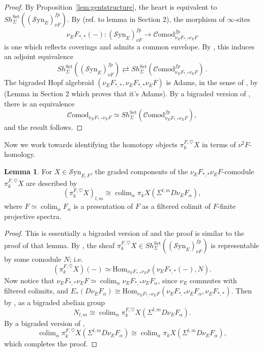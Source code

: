 \documentclass[10pt]{amsart}
\theoremstyle{definition}
\numberwithin{figure}{section}
\numberwithin{equation}{section}
\newtheorem{lemma}[figure]{Lemma}
\theoremstyle{cited}
\newcommand{\colim}{\operatorname{colim}}
\newcommand{\Hom}{\mathrm{Hom}}
\newcommand{\Syn}{\mathcal{S}\mathrm{yn}}
\newcommand{\Comod}{\mathcal{C}\mathrm{omod}}
\begin{document}
\begin{proof}
      By Proposition~\ref{lem:gentstructure}, the heart is equivalent to $Sh_{\Sigma}^{\mathrm{Set}}((\Syn_E)_{\nu F}^{fp})$. By (ref. to lemma in Section 2), the morphism of $\infty$-sites $$\nu_EF_{*,*}(-):(\Syn_E)_{\nu F}^{fp}\to\Comod_{\nu_EF_{*,*}\nu_EF}^{fp}$$ is one which reflects coverings and admits a common envelope. By \cite[Rem. 2.50]{Pst22}, this induces an adjoint equivalence $$Sh_{\Sigma}^{\mathrm{Set}}((\Syn_E)_{\nu F}^{fp})\rightleftarrows Sh_{\Sigma}^{\mathrm{Set}}(\Comod_{\nu_EF_{*,*}\nu_EF}^{fp})\,.$$
  The bigraded Hopf algebroid $(\nu_EF_{*,*},\nu_EF_{*,*}\nu_EF)$ is Adams, in the sense of \cite[Def. 3.1]{Pst22}, by (Lemma in Section 2 which proves that it's Adams). By a bigraded version of \cite[2.1.12]{GH05}, \cite[Thm. 3.2]{Pst22} there is an equivalence
  $$
  \Comod_{\nu_EF_{*,*}\nu_EF}\simeq Sh_{\Sigma}^{\mathrm{Set}}(\Comod_{\nu_EF_{*,*}\nu_EF}^{fp}),
  $$
  and the result follows.
  \end{proof}
  
  Now we work towards identifying the homotopy objects $\pi_k^{F,\heartsuit}X$ in terms of $\nu^2F$-homology.
  
  \begin{lemma}
  \label{F_dual_tstruct_lemma}
      For $X\in\Syn_{E,F}$, the graded components of the $\nu_EF_{*,*}\nu_EF$-comodule $\pi_k^{F,\heartsuit}X$ are described by
      $$
  (\pi_k^{F,\heartsuit}X)_{l,m} \cong \colim_\alpha \pi_kX(\Sigma^{l,m}D\nu_E F_\alpha),
      $$
      where $F\simeq \colim_\alpha F_\alpha$ is a presentation of $F$ as a filtered colimit of $F$-finite projective spectra.
  \end{lemma}
  
  \begin{proof}
      This is essentially a bigraded version of \cite[Lemma 4.17]{Pst22} and the proof is similar to the proof of that lemma. By \cite[Thm. 2.58]{Pst22}, the sheaf $\pi_k^{F,\heartsuit}X\in Sh_{\Sigma}^{\mathrm{Set}}((\Syn_E)_{\nu F}^{fp})$ is representable by some comodule $N$; i.e. $$(\pi_k^{F,\heartsuit}X)(-)\simeq \Hom_{\nu_EF_{*,*}\nu_EF}(\nu_EF_{*,*}(-),N).$$
      Now notice that $\nu_EF_{*,*}\nu_EF\simeq \colim_\alpha \nu_EF_{*,*}\nu_EF_\alpha$, since $\nu_E$ commutes with filtered colimits, and $E_*(D\nu_EF_\alpha)\cong\Hom_{\nu_EF_{*,*}\nu_EF}(\nu_EF_{*,*}\nu_EF_\alpha,\nu_EF_{*,*})$. Then by \cite[Lemma 3.3]{Pst22}, as a bigraded abelian group
      $$
  N_{l,m}\cong \colim_\alpha \pi_k^{F,\heartsuit}X(\Sigma^{l,m}D\nu_EF_\alpha).
      $$
      By a bigraded version of \cite[Lemma 3.25]{Pst22},
      $$
  \colim_{\alpha}\pi_k^{F,\heartsuit}X(\Sigma^{l,m}D\nu_EF_\alpha)\cong\colim_{\alpha} \pi_kX(\Sigma^{l,m}D\nu_EF_\alpha),
      $$
      which completes the proof.
  \end{proof}
  
\end{document}
